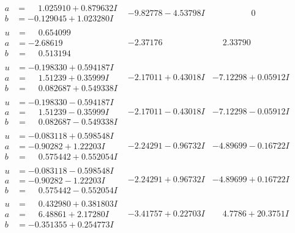 \documentclass[1p]{elsarticle_modified}
\theoremstyle{definition}
\begin{document}
$$\begin{array}{c|c|c}
\begin{aligned}
a &= \phantom{-}1.025910 + 0.879632 I \\
b &= -0.129045 + 1.023280 I\end{aligned}
 & -9.82778 - 4.53798 I & \phantom{-0.000000 } 0 \\ \hline\begin{aligned}
u &= \phantom{-}0.654099\phantom{ +0.000000I} \\
a &= -2.68619\phantom{ +0.000000I} \\
b &= \phantom{-}0.513194\phantom{ +0.000000I}\end{aligned}
 & -2.37176\phantom{ +0.000000I} & \phantom{-}2.33790\phantom{ +0.000000I} \\ \hline\begin{aligned}
u &= -0.198330 + 0.594187 I \\
a &= \phantom{-}1.51239 + 0.35999 I \\
b &= \phantom{-}0.082687 + 0.549338 I\end{aligned}
 & -2.17011 + 0.43018 I & -7.12298 + 0.05912 I \\ \hline\begin{aligned}
u &= -0.198330 - 0.594187 I \\
a &= \phantom{-}1.51239 - 0.35999 I \\
b &= \phantom{-}0.082687 - 0.549338 I\end{aligned}
 & -2.17011 - 0.43018 I & -7.12298 - 0.05912 I \\ \hline\begin{aligned}
u &= -0.083118 + 0.598548 I \\
a &= -0.90282 + 1.22203 I \\
b &= \phantom{-}0.575442 + 0.552054 I\end{aligned}
 & -2.24291 - 0.96732 I & -4.89699 - 0.16722 I \\ \hline\begin{aligned}
u &= -0.083118 - 0.598548 I \\
a &= -0.90282 - 1.22203 I \\
b &= \phantom{-}0.575442 - 0.552054 I\end{aligned}
 & -2.24291 + 0.96732 I & -4.89699 + 0.16722 I \\ \hline\begin{aligned}
u &= \phantom{-}0.432980 + 0.381803 I \\
a &= \phantom{-}6.48861 + 2.17280 I \\
b &= -0.351355 + 0.254773 I\end{aligned}
 & -3.41757 + 0.22703 I & \phantom{-}4.7786 + 20.3751 I\\

\end{array}$$
\end{document}
